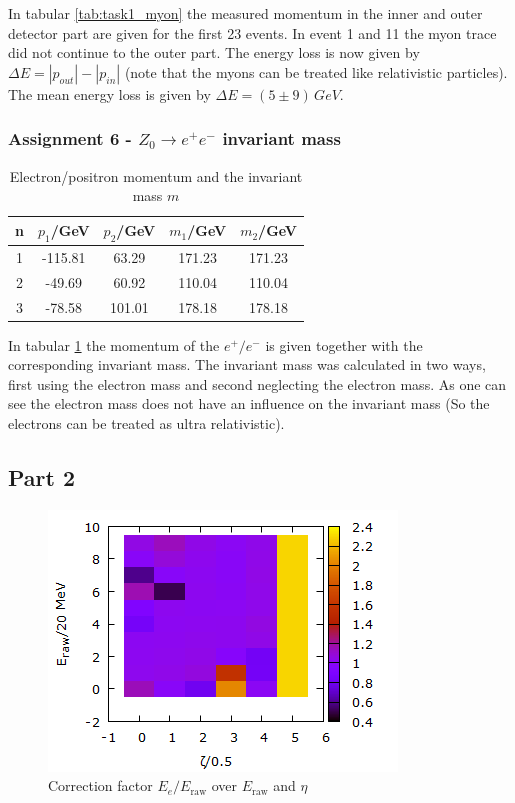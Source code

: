 In tabular \ref{tab:task1_myon} the measured momentum in the inner and outer detector part are given for the first 23 events. In event 1 and 11 the myon trace did not continue to the outer part. The energy loss is now given by $\Delta E = |p_{out}| - |p_{in}|$ (note that the myons can be treated like relativistic particles). The mean energy loss is given by $\Delta E = \si{(5 \pm 9)\,GeV}$.

\subsubsection{Assignment 6 - $Z_0 \to e^+ e^-$ invariant mass}
\begin{table}
\centering
\caption{Electron/positron momentum and the invariant mass $m$}
\begin{tabular}{ccccc}
\toprule
n & $p_1$/GeV & $p_2$/GeV & $m_1$/GeV & $m_2$/GeV\\
\midrule
1 &	-115.81&	63.29 & 171.23 & 171.23\\ 
2&	-49.69&	60.92 & 110.04 & 110.04\\
3&	-78.58&	101.01& 178.18 & 178.18\\
\bottomrule
\end{tabular}
\label{tab:task1_zee}
\end{table}

In tabular \ref{tab:task1_zee} the momentum of the $e^+/e^-$ is given together with the corresponding invariant mass. The invariant mass was calculated in two ways, first using the electron mass and second neglecting the electron mass. As one can see the electron mass does not have an influence on the invariant mass (So the electrons can be treated as ultra relativistic). 

\subsection{Part 2}
\begin{figure}
\centering
\includegraphics[scale=1]{data/zee_init/zee_init.png}
\caption{Correction factor $E_e/E_{\mathrm{raw}}$ over $E_{\mathrm{raw}}$ and $\eta$}
\label{fig:part2_factor}
\end{figure}

